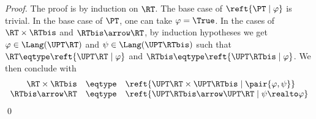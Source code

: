 \begin{proof}
The proof is by induction on $\RT$.
The base case of $\reft{\PT \mid \varphi}$ is trivial.
In the base case of $\PT$, one can take $\varphi = \True$.
In the cases of $\RT \times \RTbis$ and $\RTbis \arrow \RT$,
by induction hypotheses we get $\varphi \in \Lang(\UPT\RT)$
and $\psi \in \Lang(\UPT\RTbis)$ such that
$\RT \eqtype \reft{\UPT\RT \mid \varphi}$
and
$\RTbis \eqtype \reft{\UPT\RTbis \mid \varphi}$.
We then conclude with
\[
\begin{array}{r c l}
  \RT \times \RTbis
& \eqtype
& \reft{\UPT\RT \times \UPT\RTbis \mid \pair{\varphi,\psi}}
\\

  \RTbis \arrow \RT
& \eqtype
& \reft{\UPT\RTbis \arrow \UPT\RT \mid \psi \realto \varphi}
\end{array}
\]
\qed
\end{proof}


